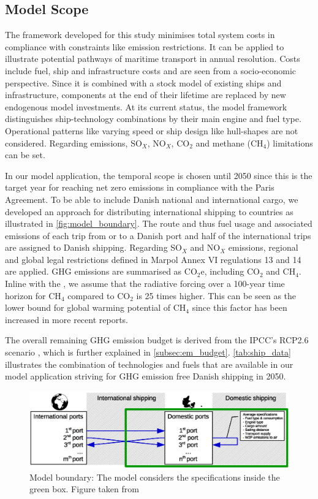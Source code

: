 \documentclass[article]{elsarticle}
\begin{document}
\subsection{Model Scope}
\label{subsec:Scope}
The framework developed for this study minimises total system costs in compliance with constraints like emission restrictions. It can be applied to illustrate potential pathways of maritime transport in annual resolution. Costs include fuel, ship and infrastructure costs and are seen from a socio-economic perspective. Since it is combined with a stock model of existing ships and infrastructure, components at the end of their lifetime are replaced by new endogenous model investments. At its current status, the model framework distinguishes ship-technology combinations by their main engine and fuel type. Operational patterns like varying speed or ship design like hull-shapes are not considered.
Regarding emissions, SO$_X$, NO$_X$, CO$_2$ and methane (CH$_4$) limitations can be set.

In our model application, the temporal scope is chosen until 2050 since this is the target year for reaching net zero emissions in compliance with the Paris Agreement. To be able to include Danish national and international cargo, we developed an approach for distributing international shipping to countries as illustrated in \autoref{fig:model_boundary}. The route and thus fuel usage and associated emissions of each trip from or to a Danish port and half of the international trips are assigned to Danish shipping. Regarding SO$_X$ and NO$_X$ emissions, regional and global legal restrictions defined in Marpol Annex VI regulations 13 and 14 \cite{IMO2008a,IMO2008b} are applied. GHG emissions are summarised as CO$_2$e, including CO$_2$ and CH$_4$. Inline with the \citet{IPCC2007}, we assume that the radiative forcing over a 100-year time horizon for CH$_4$ compared to CO$_2$ is 25 times higher. This can be seen as the lower bound for global warming potential of CH$_4$ since this factor has been increased in more recent reports.

The overall remaining GHG emission budget is derived from the IPCC's RCP2.6 scenario \cite[p.~27]{IPCC2013}, which is further explained in \autoref{subsec:em_budget}. \autoref{tab:ship_data} illustrates the combination of technologies and fuels that are available in our model application striving for GHG emission free Danish shipping in 2050.

\begin{figure}[htb]
    \centering
    \includegraphics[width=\textwidth]{figures/model_boundary_paper.eps}
    \caption{Model boundary: The model considers the specifications inside the green box. Figure taken from \cite{Thesis2018}}
    \label{fig:model_boundary}
\end{figure}
\end{document}
